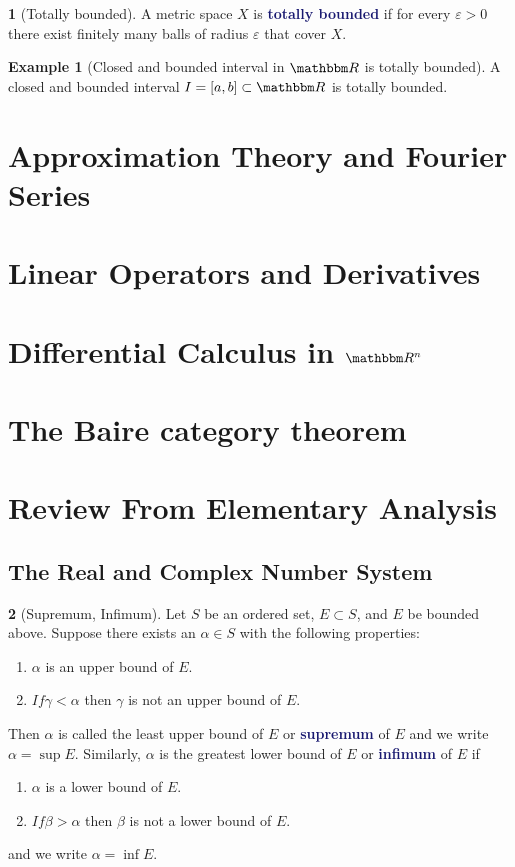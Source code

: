 \documentclass[12pt]{article}
\numberwithin{equation}{section}
\newcommand{\navy}[1]{\textcolor{MidnightBlue}{\bf #1}}
\theoremstyle{plain}
\theoremstyle{definition}
\newtheorem{definition}{\color{MidnightBlue}{\textbf{Definition}}}[section]
\newtheorem{example}{\color{WildStrawberry}Example}[section]
\newcommand{\1}{\mathbbm 1}
\newcommand{\e}{\varepsilon}
\newcommand{\RR}{\mathbbm R}
\begin{document}
\begin{definition}[Totally bounded]
	A metric space $X$ is \navy{totally bounded} if for every $\e > 0$ there exist finitely many balls of radius $\e$ that cover $X$. 
\end{definition}

\begin{example}[Closed and bounded interval in $\RR$ is totally bounded]
	A closed and bounded interval $I = [a,b] \subset \RR$ is totally bounded. 
\end{example}



\section{Approximation Theory and Fourier Series}

\section{Linear Operators and Derivatives}

\section[Differential Calculus in Rn]{Differential Calculus in $\RR^n$}

\section{The Baire category theorem}

\appendix

\section{Review From Elementary Analysis}

\subsection{The Real and Complex Number System}

\begin{definition}[Supremum, Infimum]
	Let $S$ be an ordered set, $E \subset S$, and $E$ be bounded above. Suppose there exists an $\alpha \in S$ with the following properties:
	\begin{enumerate}
		\item $\alpha$ is an upper bound of $E$.
		\item $If \gamma < \alpha$ then $\gamma$ is not an upper bound of $E$.
	\end{enumerate}
	Then $\alpha$ is called the least upper bound of $E$ or \navy{supremum} of $E$ and we write $\alpha = \sup E$. Similarly, $\alpha$ is the greatest lower bound of $E$ or \navy{infimum} of $E$ if 
	\begin{enumerate}
		\item $\alpha$ is a lower bound of $E$.
		\item $If \beta > \alpha$ then $\beta$ is not a lower bound of $E$.
	\end{enumerate}
	and we write $\alpha = \inf E$.
\end{definition}
\end{document}
